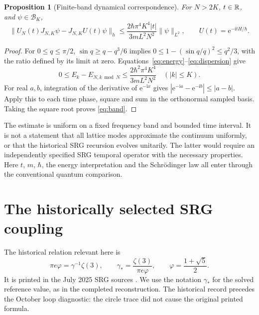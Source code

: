 \documentclass[11pt,a4paper]{article}
\newtheorem{proposition}[theorem]{Proposition}
\theoremstyle{definition}\newtheorem{definition}[theorem]{Definition}
\theoremstyle{remark}\newtheorem{remark}[theorem]{Remark}
\newcommand{\ee}{\mathrm e}\newcommand{\ii}{\mathrm i}
\newcommand{\phig}{\varphi}\newcommand{\AN}{A_{N,L}}
\numberwithin{equation}{section}
\begin{document}
\begin{proposition}[Finite-band dynamical correspondence]\label{prop:band}
For \(N>2K\), \(t\in\mathbb R\), and \(\psi\in\mathcal B_K\),
\begin{equation}
 \|U_N(t)J_{N,K}\psi-J_{N,K}U(t)\psi\|_h
 \leq\frac{2\hbar\pi^4K^4|t|}{3mL^2N^2}\|\psi\|_{L^2},
 \qquad U(t)=\ee^{-\ii tH/\hbar}.
 \label{eq:band}
\end{equation}
\end{proposition}
\begin{proof}
For \(0\leq q\leq\pi/2\), \(\sin q\geq q-q^3/6\) implies
\(0\leq1-(\sin q/q)^2\leq q^2/3\), with the ratio defined by its
limit at zero. Equations~\eqref{eq:energy}--\eqref{eq:dispersion} give
\[
 0\leq E_k-E_{N,k\bmod N}
 \leq\frac{2\hbar^2\pi^4K^4}{3mL^2N^2}
 \quad (|k|\leq K).
\]
For real \(a,b\), integration of the derivative of \(\ee^{-\ii x}\)
gives \(|\ee^{-\ii a}-\ee^{-\ii b}|\leq|a-b|\).
Apply this to each time phase, square and sum in the orthonormal
sampled basis. Taking the square root proves \eqref{eq:band}.
\end{proof}

The estimate is uniform on a fixed frequency band and bounded time
interval. It is not a statement that all lattice modes approximate the
continuum uniformly, or that the historical SRG recursion evolves
unitarily. The latter would require an independently specified SRG
temporal operator with the necessary properties. Here \(t\), \(m\),
\(\hbar\), the energy interpretation and the Schr\"odinger law all enter
through the conventional quantum comparison.

\section{The historically selected SRG coupling}\label{sec:coupling}
The historical relation relevant here is
\begin{equation}
 \pi e\phig=\gamma^{-1}\zeta(3),\qquad
 \gamma_*=\frac{\zeta(3)}{\pi e\phig},\qquad
 \phig=\frac{1+\sqrt5}{2}.
 \label{eq:lock}
\end{equation}
It is printed in the July 2025 SRG sources
\cite[physical p.~3, Eq.~(1)]{p01}
\cite[physical p.~4, Eq.~(2)]{p06}.
We use the notation \(\gamma_*\) for the solved reference value, as in the
completed reconstruction. The historical record precedes the October
loop diagnostic: the circle trace did not cause the original printed
formula.
\end{document}
